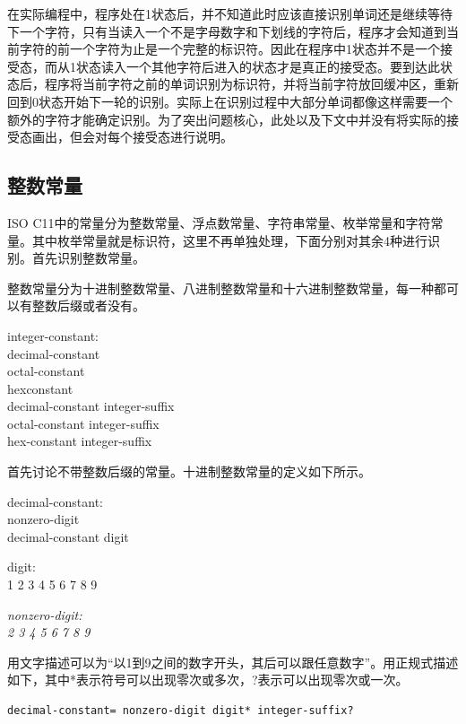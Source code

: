 \documentclass[UTF8, twoside, titlepage]{ctexart}
\newenvironment{lex}
{
	\linespread{1.2}
	\leftskip=2.5cm
	\rightskip=2.5cm
	\itshape
	\setlength{\parindent}{-1cm}
}
{\par}
\begin{document}
在实际编程中，程序处在1状态后，并不知道此时应该直接识别单词还是继续等待下一个字符，只有当读入一个不是字母数字和下划线的字符后，程序才会知道到当前字符的前一个字符为止是一个完整的标识符。因此在程序中1状态并不是一个接受态，而从1状态读入一个其他字符后进入的状态才是真正的接受态。要到达此状态后，程序将当前字符之前的单词识别为标识符，并将当前字符放回缓冲区，重新回到0状态开始下一轮的识别。实际上在识别过程中大部分单词都像这样需要一个额外的字符才能确定识别。为了突出问题核心，此处以及下文中并没有将实际的接受态画出，但会对每个接受态进行说明。

\subsection{整数常量}
ISO C11中的常量分为整数常量、浮点数常量、字符串常量、枚举常量和字符常量。其中枚举常量就是标识符，这里不再单独处理，下面分别对其余4种进行识别。首先识别整数常量。

整数常量分为十进制整数常量、八进制整数常量和十六进制整数常量，每一种都可以有整数后缀或者没有。

\begin{lex}
integer-constant:\\
	decimal-constant \\
	octal-constant \\
	hexconstant \\
	decimal-constant integer-suffix \\
	octal-constant integer-suffix \\
	hex-constant integer-suffix
\end{lex}

首先讨论不带整数后缀的常量。十进制整数常量的定义如下所示。

\begin{lex}
decimal-constant:\\
	nonzero-digit \\
	decimal-constant digit

digit: \\
{
	\normalfont
	 1 2 3 4 5 6 7 8 9
}

\itshape
nonzero-digit: \\
{
	\normalfont
	 2 3 4 5 6 7 8 9
}
\end{lex}

用文字描述可以为“以1到9之间的数字开头，其后可以跟任意数字”。用正规式描述如下，其中*表示符号可以出现零次或多次，?表示可以出现零次或一次。

\begin{lstlisting}
decimal-constant= nonzero-digit digit* integer-suffix?
\end{lstlisting}
\end{document}
